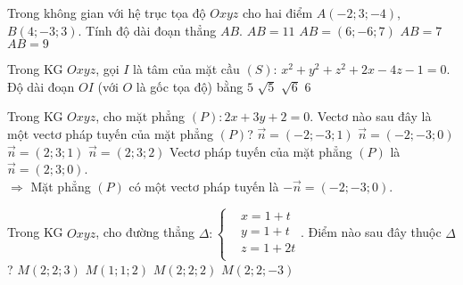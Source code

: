 \begin{ex}%
Trong không gian với hệ trục tọa độ $Oxyz$ cho hai điểm $A(-2; 3;-4)$, $B(4;-3; 3)$. Tính độ dài đoạn thẳng $AB$.
\choice
{\True $AB=11$}
{$AB=(6;-6; 7)$}
{$AB=7$}
{$AB=9$}
\end{ex}

\begin{ex}%
Trong KG $Oxyz$, gọi $I$ là tâm của mặt cầu $(S)$: $x^2+y^2+z^2+2x-4z-1=0$. Độ dài đoạn $OI$ (với $O$ là gốc tọa độ) bằng
\choice
{$5$}
{\True $\sqrt{5}$}
{$\sqrt{6}$}
{$6$}
\end{ex}

\begin{ex}%
Trong KG $Oxyz$, cho mặt phẳng $(P)\colon 2x+3y+2=0$. Vectơ nào sau đây là một vectơ pháp tuyến của mặt phẳng $(P)$?
\choice
{$\overrightarrow{n}=(-2;-3;1)$}
{\True $\overrightarrow{n}=(-2;-3;0)$}
{$\overrightarrow{n}=(2;3;1)$}
{$\overrightarrow{n}=(2;3;2)$}
\loigiai
{
Vectơ pháp tuyến của mặt phẳng $(P)$ là $\overrightarrow{n}=(2;3;0)$.\\
$\Rightarrow$ Mặt phẳng $(P)$ có một vectơ pháp tuyến là $-\overrightarrow{n}=(-2;-3;0)$.
}
\end{ex}

\begin{ex}%
Trong KG $Oxyz$, cho đường thẳng $\Delta \colon \left\{ \begin{aligned}
& x=1+t \\ & y=1+t \\ & z=1+2t \\ \end{aligned} \right.$. Điểm nào sau đây thuộc $\Delta$?
\choice
{\True $M(2;2;3)$}
{$M(1;1;2)$}
{$M(2;2;2)$}
{$M(2;2;-3)$}
\end{ex}

